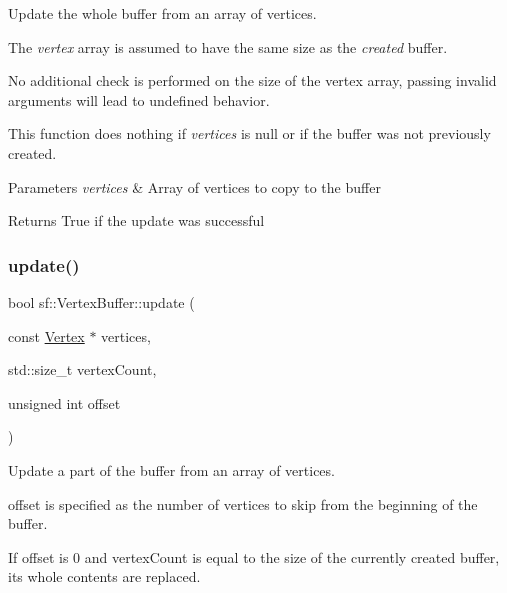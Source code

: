 Update the whole buffer from an array of vertices. 

The {\itshape vertex} array is assumed to have the same size as the {\itshape created} buffer.

No additional check is performed on the size of the vertex array, passing invalid arguments will lead to undefined behavior.

This function does nothing if {\itshape vertices} is null or if the buffer was not previously created.


\begin{DoxyParams}{Parameters}
{\em vertices} & Array of vertices to copy to the buffer\\
\hline
\end{DoxyParams}
\begin{DoxyReturn}{Returns}
True if the update was successful \begin{DoxyVerb}\end{DoxyVerb}
 
\end{DoxyReturn}
\mbox{\label{classsf_1_1_vertex_buffer_ae6c8649a64861507010d21e77fbd53fa}} 
\subsubsection{\texorpdfstring{update()}{update()}\hspace{0.1cm}{\footnotesize\ttfamily [2/3]}}
{\footnotesize\ttfamily bool sf\+::\+Vertex\+Buffer\+::update (\begin{DoxyParamCaption}\item[{const \mbox{\hyperlink{classsf_1_1_vertex}{Vertex}} $\ast$}]{vertices,  }\item[{std\+::size\+\_\+t}]{vertex\+Count,  }\item[{unsigned int}]{offset }\end{DoxyParamCaption})}



Update a part of the buffer from an array of vertices. 

{\ttfamily offset} is specified as the number of vertices to skip from the beginning of the buffer.

If {\ttfamily offset} is 0 and {\ttfamily vertex\+Count} is equal to the size of the currently created buffer, its whole contents are replaced.

